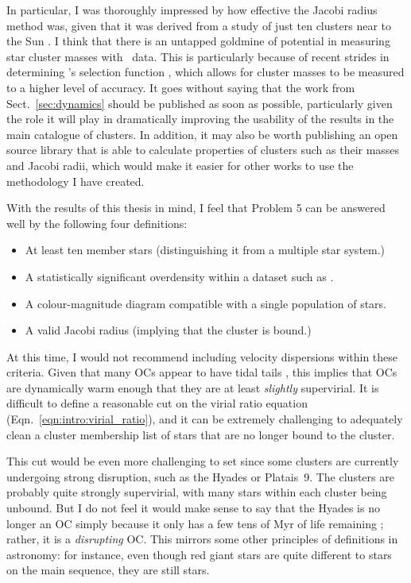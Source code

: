 In particular, I was thoroughly impressed by how effective the Jacobi radius method was, given that it was derived from a study of just ten clusters near to the Sun \citep{meingast_extended_2021}. I think that there is an untapped goldmine of potential in measuring star cluster masses with \gaia\ data. This is particularly because of recent strides in determining \gaia's selection function \citep{cantat-gaudin_empirical_model_2023,castro-ginard_estimating_selection_2023}, which allows for cluster masses to be measured to a higher level of accuracy. It goes without saying that the work from Sect.~\ref{sec:dynamics} should be published as soon as possible, particularly given the role it will play in dramatically improving the usability of the results in the main catalogue of clusters. In addition, it may also be worth publishing an open source library that is able to calculate properties of clusters such as their masses and Jacobi radii, which would make it easier for other works to use the methodology I have created.

With the results of this thesis in mind, I feel that Problem 5 can be answered well by the following four definitions:

\begin{itemize}
    \item At least ten member stars (distinguishing it from a multiple star system.)
    \item A statistically significant overdensity within a dataset such as \gaia.
    \item A colour-magnitude diagram compatible with a single population of stars.
    \item A valid Jacobi radius (implying that the cluster is bound.)
\end{itemize}

At this time, I would not recommend including velocity dispersions within these criteria. Given that many OCs appear to have tidal tails \citep{tarricq_structural_2022}, this implies that OCs are dynamically warm enough that they are at least \emph{slightly} supervirial. It is difficult to define a reasonable cut on the virial ratio equation (Eqn.~\ref{eqn:intro:virial_ratio}), and it can be extremely challenging to adequately clean a cluster membership list of stars that are no longer bound to the cluster. 

This cut would be even more challenging to set since some clusters are currently undergoing strong disruption, such as the Hyades or Platais~9. The clusters are probably quite strongly supervirial, with many stars within each cluster being unbound. But I do not feel it would make sense to say that the Hyades is no longer an OC simply because it only has a few tens of Myr of life remaining \citep{oh_kinematic_modelling_2020}; rather, it is a \emph{disrupting} OC. This mirrors some other principles of definitions in astronomy: for instance, even though red giant stars are quite different to stars on the main sequence, they are still stars. 

